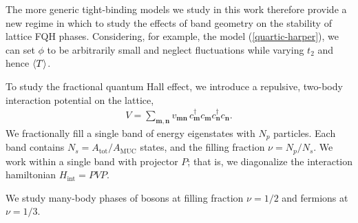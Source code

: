 \documentclass[aps,prb,twocolumn,letterpaper,twoside,nobalancelastpage,groupedaddress,amsmath,amssymb,floatfix,citeautoscript]{revtex4-1}
\begin{document}
The more generic tight-binding models we study in this work therefore provide a new regime in which to study the effects of band geometry on the stability of lattice FQH phases. Considering, for example, the model (\ref{quartic-harper}), we can set $\phi$ to be arbitrarily small and neglect fluctuations while varying $t_2$ and hence $\expval{T}$.

To study the fractional quantum Hall effect, we introduce a repulsive, two-body interaction potential on the lattice,
\begin{align*}
V = \sum_{\mathbf{m},\mathbf{n}}v_{\mathbf{m}\mathbf{n}}\, c^{\dag}_\mathbf{m} c_\mathbf{m} c^{\dag}_\mathbf{n} c_\mathbf{n}.
\end{align*}
We fractionally fill a single band of energy eigenstates with $N_p$ particles. Each band contains $N_s = A_{\text{tot}}/A_{\text{MUC}}$ states, and the filling fraction $\nu = N_p /N_s$. We work within a single band with projector $P$; that is, we diagonalize the interaction hamiltonian $H_{\text{int}} = PVP$. 

We study many-body phases of bosons at filling fraction $\nu=1/2$ and fermions at $\nu=1/3$.



\end{document}
